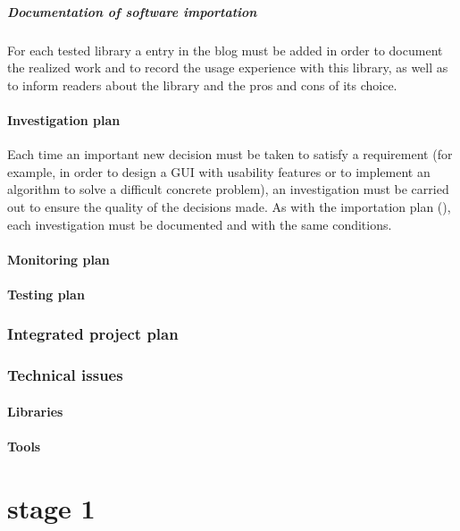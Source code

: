 \documentclass[twocolumn]{article}
\begin{document}
\subsubsection{Documentation of software importation}
\label{sssec:doc-importation-plan}
For each tested library a entry in the \fav blog must be added in
order to document the realized work and to record the usage
experience with this library, as well as to inform readers about the
library and the pros and cons of its choice.

\subsection{Investigation plan}
\label{ssec:investigation-plan}
Each time an important new decision must be taken to satisfy a
requirement (for example, in order to design a GUI with usability
features or to implement an algorithm to solve a difficult concrete problem), an
investigation must be carried out to ensure the quality of the
decisions made. As with the importation plan
(), each investigation must be
documented and with the same conditions.

\subsection{Monitoring plan}
\label{ssec:monitoring-plan}


\subsection{Testing plan}
\label{ssec:testing-plan}


\section{Integrated project plan}
\label{ssec:integrated-plan}

\section{Technical issues}
\subsection{Libraries}
\subsection{Tools}

\part{\favpl stage 1}
\label{part:st1-plan}
\end{document}
